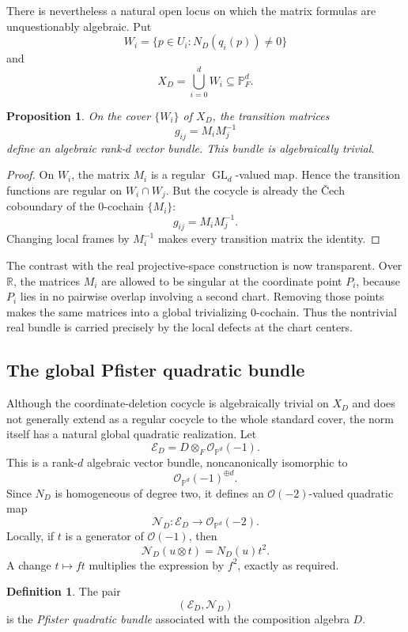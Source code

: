 \documentclass[12pt]{article}
\theoremstyle{plain}
\newtheorem{proposition}[theorem]{Proposition}
\theoremstyle{definition}
\newtheorem{definition}[theorem]{Definition}
\newcommand{\R}{\mathbb R}
\newcommand{\PP}{\mathbb P}
\newcommand{\OO}{\mathcal O}
\newcommand{\GL}{\operatorname{GL}}
\begin{document}
There is nevertheless a natural open locus on which the matrix formulas
are unquestionably algebraic. Put
\[
W_i=\{p\in U_i:N_D(q_i(p))\ne0\}
\]
and
\[
X_D=\bigcup_{i=0}^d W_i\subseteq\PP^d_F.
\]

\begin{proposition}
	\label{prop:algebraic-triviality-general}
	On the cover $\{W_i\}$ of $X_D$, the transition matrices
	\[
	g_{ij}=M_iM_j^{-1}
	\]
	define an algebraic rank-$d$ vector bundle. This bundle is
	algebraically trivial.
\end{proposition}

\begin{proof}
	On $W_i$, the matrix $M_i$ is a regular $\GL_d$-valued map. Hence the
	transition functions are regular on $W_i\cap W_j$. But the cocycle is
	already the \v{C}ech coboundary of the $0$-cochain $\{M_i\}$:
	\[
	g_{ij}=M_iM_j^{-1}.
	\]
	Changing local frames by $M_i^{-1}$ makes every transition matrix the
	identity.
\end{proof}


The contrast with the real projective-space construction is now
transparent. Over $\R$, the matrices $M_i$ are allowed to be singular
at the coordinate point $P_i$, because $P_i$ lies in no pairwise
overlap involving a second chart. Removing those points makes the
same matrices into a global trivializing $0$-cochain. Thus the
nontrivial real bundle is carried precisely by the local defects at the
chart centers.

\subsection{The global Pfister quadratic bundle}

Although the coordinate-deletion cocycle is algebraically trivial on
$X_D$ and does not generally extend as a regular cocycle to the whole
standard cover, the norm itself has a natural global quadratic realization.
Let
\[
\mathscr E_D=D\otimes_F\OO_{\PP^d}(-1).
\]
This is a rank-$d$ algebraic vector bundle, noncanonically isomorphic to
\[
\OO_{\PP^d}(-1)^{\oplus d}.
\]
Since $N_D$ is homogeneous of degree two, it defines an
$\OO(-2)$-valued quadratic map
\[
\mathscr N_D:\mathscr E_D\longrightarrow\OO_{\PP^d}(-2).
\]
Locally, if $t$ is a generator of $\OO(-1)$, then
\[
\mathscr N_D(u\otimes t)=N_D(u)t^2.
\]
A change $t\mapsto ft$ multiplies the expression by $f^2$, exactly as
required.

\begin{definition}
	The pair
	\[
	(\mathscr E_D,\mathscr N_D)
	\]
	is the \emph{Pfister quadratic bundle} associated with the composition
	algebra $D$.
\end{definition}
\end{document}
